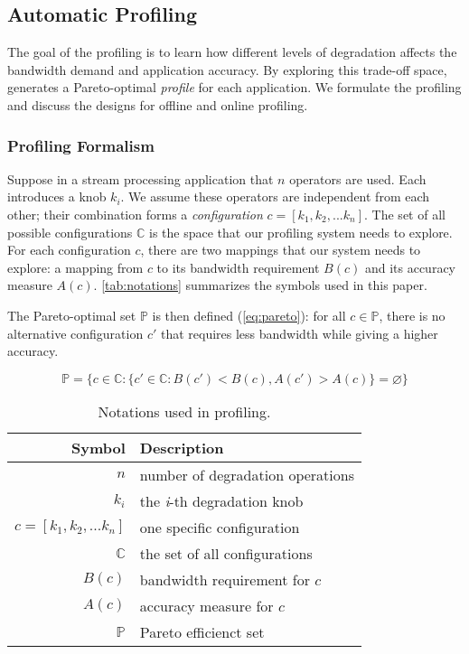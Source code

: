 \subsection{Automatic Profiling}
\label{sec:automatic-profiling}

The goal of the profiling is to learn how different levels of degradation
affects the bandwidth demand and application accuracy. By exploring this
trade-off space, \sysname{} generates a Pareto-optimal \textit{profile} for each
application. We formulate the profiling and discuss the designs for offline and
online profiling.

\subsubsection{Profiling Formalism}
\label{sec:formalize-profiling}

Suppose in a stream processing application that $n$ \maybe{} operators are
used. Each introduces a knob $k_i$. We assume these operators are independent
from each other; their combination forms a \textit{configuration}
$c = [k_{1}, k_{2}, ... k_{n}]$. The set of all possible configurations
$\mathbb{C}$ is the space that our profiling system needs to explore. For each
configuration $c$, there are two mappings that our system needs to explore: a
mapping from $c$ to its bandwidth requirement $B(c)$ and its accuracy measure
$A(c)$. \autoref{tab:notations} summarizes the symbols used in this paper.

The Pareto-optimal set $\mathbb{P}$ is then defined (\autoref{eq:pareto}): for
all $c \in \mathbb{P}$, there is no alternative configuration $c'$ that requires
less bandwidth while giving a higher accuracy.

{\small
\begin{equation}
  \mathbb{P} = \{ c \in \mathbb{C} : \{ c' \in \mathbb{C}: B(c') < B(c),
  A(c') > A(c) \} = \varnothing\}
  \label{eq:pareto}
\end{equation}
}%

\begin{table}
  \centering
  \begin{tabular}{r l}
    \toprule
    \textbf{Symbol} & \textbf{Description} \\
    \midrule
    $n$ & number of degradation operations \\
    $k_i$ & the \textit{i}-th degradation knob \\
    $c = [k_{1}, k_{2}, ... k_{n}]$ & one specific configuration \\
    $\mathbb{C}$ & the set of all configurations \\
    \midrule
    $B(c)$ & bandwidth requirement for $c$ \\
    $A(c)$ & accuracy measure for $c$ \\
    $\mathbb{P}$ & Pareto efficienct set \\
    \bottomrule
  \end{tabular}
  \caption{Notations used in profiling.}
  \label{tab:notations}
\end{table}

